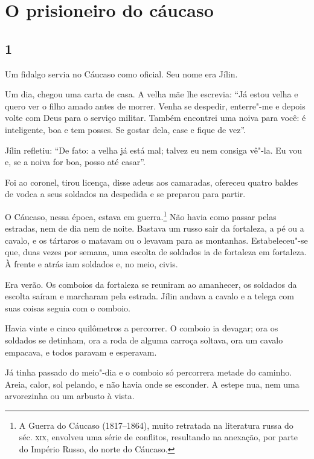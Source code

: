 \chapter[O prisioneiro do cáucaso]{O prisioneiro do cáucaso} \label{part4}

\section{1}

\noindent{}Um fidalgo servia no Cáucaso como oficial. Seu nome era Jílin.

Um dia, chegou uma carta de casa. A velha mãe lhe escrevia: ``Já estou
velha e quero ver o filho amado antes de morrer. Venha se despedir,
enterre"-me e depois volte com Deus para o serviço militar. Também
encontrei uma noiva para você: é inteligente, boa e tem posses. Se gostar dela, case e fique de vez''.

Jílin refletiu: ``De fato: a velha já está mal; talvez eu nem consiga
vê"-la. Eu vou e, se a noiva for boa, posso até casar''.

Foi ao coronel, tirou licença, disse adeus aos camaradas, ofereceu
quatro baldes de vodca a seus soldados na despedida e se preparou para
partir.

O Cáucaso, nessa época, estava em guerra.\footnote{A Guerra do Cáucaso
  (1817--1864), muito retratada na literatura russa do séc. \textsc{xix},
  envolveu uma série de conflitos, resultando na anexação, por parte do
  Império Russo, do norte do Cáucaso.} Não havia como passar pelas
estradas, nem de dia nem de noite. Bastava um russo sair da fortaleza, a
pé ou a cavalo, e os tártaros o matavam ou o levavam para as montanhas.
Estabeleceu"-se que, duas vezes por semana, uma escolta de soldados ia de
fortaleza em fortaleza. À frente e atrás iam soldados e, no meio, civis.

Era verão. Os comboios da fortaleza se reuniram ao amanhecer, os
soldados da escolta saíram e marcharam pela estrada. Jílin andava a
cavalo e a telega com suas coisas seguia com o comboio.

Havia vinte e cinco quilômetros a percorrer. O comboio ia devagar; ora
os soldados se detinham, ora a roda de alguma carroça soltava, ora um
cavalo empacava, e todos paravam e esperavam.

Já tinha passado do meio"-dia e o comboio só percorrera metade do
caminho. Areia, calor, sol pelando, e não havia onde se esconder. A
estepe nua, nem uma arvorezinha ou um arbusto à vista.

